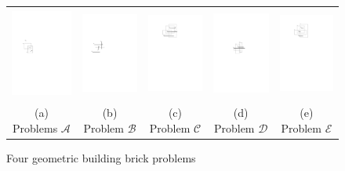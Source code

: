 \documentclass[sigconf]{acmart}
\def\figcapup{\vspace{-0mm}}
\def\figcapdown{\vspace{-0mm}}
\begin{document}
\begin{figure}
    \begin{tabular}{ccccc}
        \includegraphics[height=30mm]{./artwork/prob-a} & 
        \hspace{3mm}
        \includegraphics[height=27mm]{./artwork/prob-b} &
        \hspace{3mm}
        \includegraphics[height=30mm]{./artwork/prob-c} &
        \hspace{3mm}
        \includegraphics[height=30mm]{./artwork/prob-d} &
        \hspace{3mm}
        \includegraphics[height=30mm]{./artwork/prob-e} \\[2mm]
        (a) Problems $\mathscr{A}$ &
        \hspace{3mm}
        (b) Problem $\mathscr{B}$ &
        \hspace{3mm}
        (c) Problem $\mathscr{C}$ &
        \hspace{3mm}
        (d) Problem $\mathscr{D}$ &
        \hspace{3mm}
        (e) Problem $\mathscr{E}$
    \end{tabular}

    \figcapup
    \caption{Four geometric building brick problems}
    \label{fig:probs}
    \figcapdown
\end{figure}
\end{document}
